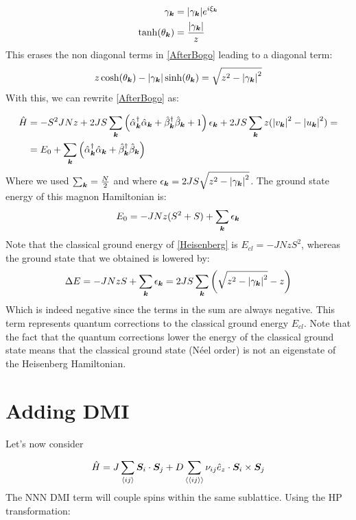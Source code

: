\begin{align}
\gamma_{\boldsymbol{k}} &= \abs{\gamma_{\boldsymbol{k}}} e^{i\xi_{\boldsymbol{k}}} \\
\tanh(\theta_{\boldsymbol{k}}) &= \frac{\abs{\gamma_{\boldsymbol{k}}}}{z}
\end{align}
This erases the non diagonal terms in \ref{AfterBogo} leading to a diagonal term:
\begin{equation}
z\cosh(\theta_{\boldsymbol{k}})-\abs{\gamma_{\boldsymbol{k}}}\sinh(\theta_{\boldsymbol{k}}) = \sqrt{z^2-\abs{\gamma_{\boldsymbol{k}}}^2}
\end{equation}
With this, we can rewrite \ref{AfterBogo} as:

\begin{align}
\hat{H} &= -S^2JNz + 2JS \sum_{\boldsymbol{k}}\left( \hat{\alpha}_{\boldsymbol{k}}^\dagger \hat{\alpha}_{\boldsymbol{k}} +\hat{\beta}_{\boldsymbol{k}}^\dagger \hat{\beta}_{\boldsymbol{k}}+1 \right)\epsilon_{\boldsymbol{k}}+2JS \sum_{\boldsymbol{k}}z(\abs{v_{\boldsymbol{k}}}^2-\abs{u_{\boldsymbol{k}}}^2) = \nonumber \\
&= E_0 + \sum_{\boldsymbol{k}}\left( \hat{\alpha}_{\boldsymbol{k}}^\dagger \hat{\alpha}_{\boldsymbol{k}} +\hat{\beta}_{\boldsymbol{k}}^\dagger \hat{\beta}_{\boldsymbol{k}} \right)
\end{align}
Where we used $\sum_{\boldsymbol{k}}=\frac{N}{2}$ and where $\epsilon_{\boldsymbol{k}} = 2JS \sqrt{z^2-\abs{\gamma_{\boldsymbol{k}}}^2}$. The ground state energy of this magnon Hamiltonian is:
\begin{equation}
E_0 = -JNz(S^2+S)+\sum_{\boldsymbol{k}}\epsilon_{\boldsymbol{k}} \label{HeisenbergMagnonGS}
\end{equation}
Note that the classical ground energy of \ref{Heisenberg} is $E_{cl}=-JNzS^2$, whereas the ground state that we obtained is lowered by:
\begin{equation}
\Delta E=-JNzS+\sum_{\boldsymbol{k}}\epsilon_{\boldsymbol{k}} = 2JS\sum_{\boldsymbol{k}}\left( \sqrt{z^2-\abs{\gamma_{\boldsymbol{k}}}^2} - z\right)
\end{equation}
Which is indeed negative since the terms in the sum are always negative. This term represents quantum corrections to the classical ground energy $E_{cl}$. Note that the fact that the quantum corrections lower the energy of the classical ground state means that the classical ground state (N\'eel order) is not an eigenstate of the Heisenberg Hamiltonian.

\section{Adding DMI}

Let's now consider

\begin{equation}
\hat{H} = J \sum_{\langle i j \rangle} \boldsymbol{S}_i\cdot \boldsymbol{S}_j + D \sum_{\langle \langle i j \rangle \rangle} \nu_{ij}\hat{e}_z\cdot \boldsymbol{S}_i \times \boldsymbol{S}_j
\end{equation}
The NNN DMI term will couple spins within the same sublattice. Using the HP transformation:

